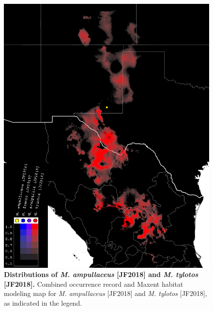 \documentclass[fleqn,10pt,lineno]{wlpeerj} %
\begin{document}
\begin{figure}[h]
	\centering
	\includegraphics[width=\textwidth]{tylotos_ampullaceus.png}
	\caption{\textbf{Distributions of \textit{M. ampullaceus} [JF2018] and \textit{M. tylotos} [JF2018].} Combined occurrence record and Maxent habitat modeling map for \textit{M. ampullaceus} [JF2018] and \textit{M. tylotos} [JF2018], as indicated in the legend.}
	\label{fig:map_amptyl}
\end{figure}
\end{document}
